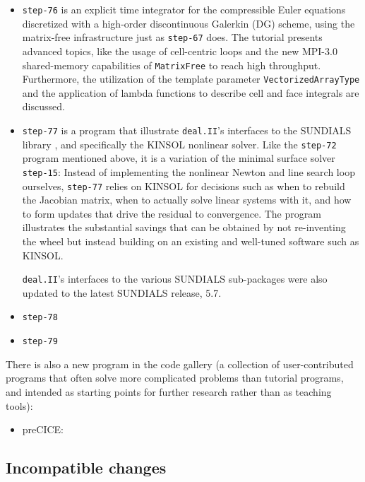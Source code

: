 \documentclass{ansarticle-preprint}
\newcommand{\specialword}[1]{\texttt{#1}}
\newcommand{\dealii}{{\specialword{deal.II}}\xspace}
\begin{document}
\begin{itemize}
\item \texttt{step-76} is an explicit time integrator for the
      compressible Euler equations discretized with a high-order discontinuous
      Galerkin (DG) scheme, using the matrix-free infrastructure just as \texttt{step-67} does.
      The tutorial presents advanced topics, like the usage of cell-centric loops and
      the new MPI-3.0 shared-memory capabilities of \texttt{MatrixFree} to reach high
      throughput. Furthermore, the utilization of the template parameter
      \texttt{VectorizedArrayType} and the application of lambda functions to describe cell and face
      integrals are discussed.

\item \texttt{step-77} is a program that illustrate \dealii{}'s
  interfaces to the SUNDIALS library \cite{sundials}, and specifically
  the KINSOL nonlinear solver. Like the \texttt{step-72} program
  mentioned above, it is a variation of the minimal surface solver
  \texttt{step-15}: Instead of implementing the nonlinear Newton and
  line search loop ourselves, \texttt{step-77} relies on KINSOL for
  decisions such as when to rebuild the Jacobian matrix, when to
  actually solve linear systems with it, and how to form updates that
  drive the residual to convergence. The program illustrates the
  substantial savings that can be obtained by not re-inventing the
  wheel but instead building on an existing and well-tuned software
  such as KINSOL.

  \dealii{}'s interfaces to the various SUNDIALS sub-packages were also updated to the latest SUNDIALS release, 5.7.

\item \texttt{step-78} 

\item \texttt{step-79} 
\end{itemize}

There is also a new program in the code gallery (a collection of
user-contributed programs that often solve more complicated problems
than tutorial programs, and intended as starting points for further
research rather than as teaching tools):
\begin{itemize}
  \item preCICE: 
\end{itemize}



\subsection{Incompatible changes}\label{subsec:deprecated}
\end{document}

